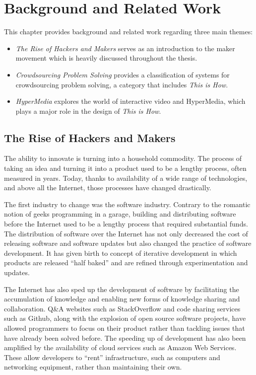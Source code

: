 \chapter{Background and Related Work}
\label{chap_background}

This chapter provides background and related work regarding three main themes:

\begin{itemize}
\item \textit{The Rise of Hackers and Makers} serves as an introduction to the maker movement which is heavily discussed throughout the thesis. 
\item \textit{Crowdsourcing Problem Solving} provides a classification of systems for crowdsourcing problem solving, a category that includes \textit{This is How}. 
\item \textit{HyperMedia} explores the world of interactive video and HyperMedia, which plays a major role in the design of \textit{This is How}.
\end{itemize}

\section{The Rise of Hackers and Makers}

The ability to innovate is turning into a household commodity. The process of taking an idea and turning it into a product used to be a lengthy process, often measured in years. Today, thanks to availability of a wide range of technologies, and above all the Internet, those processes have changed drastically. 

The first industry to change was the software industry. Contrary to the romantic notion of geeks programming in a garage, building and distributing software before the Internet used to be a lengthy process that required substantial funds. The distribution of software over the Internet has not only decreased the cost of releasing software and software updates but also changed the practice of software development. It has given birth to concept of iterative development in which products are released ``half baked'' and are refined through experimentation and updates. \cite{abrahamsson2002agile}

The Internet has also sped up the development of software by facilitating the accumulation of knowledge and enabling new forms of knowledge sharing and collaboration. Q\&A websites such as StackOverflow\cite{stackoverflow} and code sharing services such as Github\cite{github}, along with the explosion of open source software projects, have allowed programmers to focus on their product rather than tackling issues that have already been solved before. The speeding up of development has also been amplified by the availability of cloud services such as Amazon Web Services\cite{aws}. These allow developers to ``rent'' infrastructure, such as computers and networking equipment, rather than maintaining their own.

